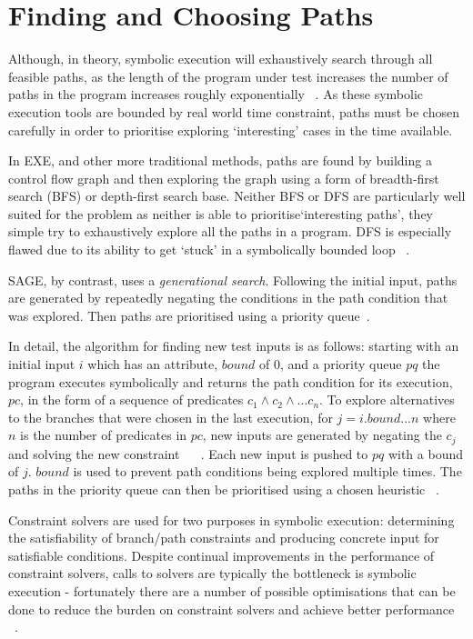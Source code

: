 \documentclass[]{final_report}
\begin{document}
\section{Finding and Choosing Paths}

Although, in theory, symbolic execution will exhaustively search through all feasible paths, as the length of the program under test increases the number of paths in the program increases roughly exponentially ~\cite{cadar2013symbolic}. As these symbolic execution tools are bounded by real world time constraint, paths must be chosen carefully in order to prioritise exploring `interesting' cases in the time available.

In EXE, and other more traditional methods, paths are found by building a control flow graph and then exploring the graph using a form of breadth-first search (BFS) or depth-first search base. Neither BFS or DFS are particularly well suited for the problem as neither is able to prioritise`interesting paths', they simple try to exhaustively explore all the paths in a program. DFS is especially flawed due to its ability to get `stuck' in a symbolically bounded loop ~\cite{cadar2008exe}. 

SAGE, by contrast, uses a \textit{generational search}. Following the initial input, paths are generated by repeatedly negating the conditions in the path condition that was explored. Then paths are prioritised using a priority queue~\cite{godefroid2005dart}.

In detail, the algorithm for finding new test inputs is as follows: starting with an initial input $i$ which has an attribute, $bound$ of 0, and a priority queue $pq$ the program executes symbolically and returns the path condition for its execution, $pc$, in the form of a sequence of predicates $c_1 \land c_2 \land ... c_n $.  To explore alternatives to the branches that were chosen in the last execution, for $j = i.bound ... n$ where $n$ is the number of predicates in $pc$,  new inputs are generated by negating the $c_j$ and solving the new constraint ~\cite{godefroid2005dart} ~\cite{godefroid2008grammar}.  Each new input is pushed to $pq$ with a bound of $j$. $bound$ is used to prevent path conditions being explored multiple times. The paths in the priority queue can then be prioritised using a chosen heuristic ~\cite{cadar2013symbolic}. 

Constraint solvers are used for two purposes in symbolic execution: determining the satisfiability of branch/path constraints and producing concrete input for satisfiable conditions. Despite continual improvements in the performance of constraint solvers, calls to solvers are typically the bottleneck is symbolic execution - fortunately there are a number of possible optimisations that can be done to reduce the burden on constraint solvers and achieve better performance ~\cite{cadar2013symbolic}.
\end{document}
